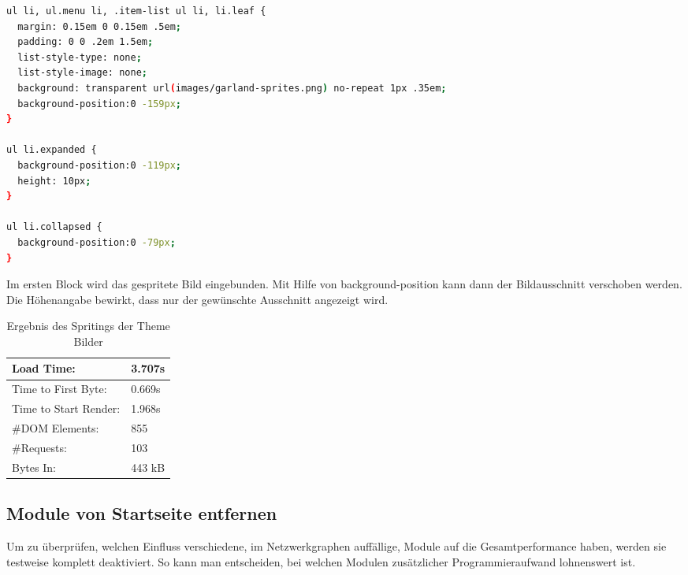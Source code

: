\begin{minipage}[t]{1\textwidth}
\begin{lstlisting}[language=bash,label=CSS-Spriting,caption=CSS-Spriting]
ul li, ul.menu li, .item-list ul li, li.leaf {
  margin: 0.15em 0 0.15em .5em;
  padding: 0 0 .2em 1.5em;
  list-style-type: none;
  list-style-image: none;
  background: transparent url(images/garland-sprites.png) no-repeat 1px .35em;
  background-position:0 -159px;
}

ul li.expanded {
  background-position:0 -119px;
  height: 10px;
}

ul li.collapsed {
  background-position:0 -79px;
}

\end{lstlisting}
\end{minipage}

Im ersten Block wird das gespritete Bild eingebunden. Mit Hilfe von background-position kann dann der Bildausschnitt verschoben werden. Die H\"ohenangabe bewirkt, dass nur der gew\"unschte Ausschnitt angezeigt wird.

\begin{table}[!ht]
\centering
\caption{Ergebnis des Spritings der Theme Bilder}
    \begin{tabular}{ | p{3cm} | p{1.5cm} | }
    \hline
    Load Time: 			& 3.707s 	\\ \hline
    Time to First Byte:		& 0.669s  	\\ \hline
    Time to Start Render:	& 1.968s	\\ \hline
    \#DOM Elements:		& 855 		\\ \hline
    \#Requests:			& 103 		\\ \hline
    Bytes In:			& 443 kB 	\\ \hline
    \hline
    \end{tabular}
\end{table}


\subsection{Module von Startseite entfernen}
Um zu überprüfen, welchen Einfluss verschiedene, im Netzwerkgraphen auffällige, Module auf die Gesamtperformance haben, werden sie testweise komplett deaktiviert. So kann man entscheiden, bei welchen Modulen zusätzlicher Programmieraufwand lohnenswert ist.
